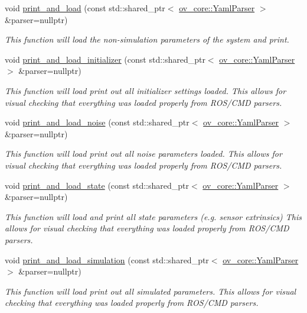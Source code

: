 \begin{DoxyCompactItemize}
\item 
void \hyperlink{structov__init_1_1InertialInitializerOptions_a4b4ecffffd22caa546e78b7765e6d0ea}{print\+\_\+and\+\_\+load} (const std\+::shared\+\_\+ptr$<$ \hyperlink{classov__core_1_1YamlParser}{ov\+\_\+core\+::\+Yaml\+Parser} $>$ \&parser=nullptr)
\begin{DoxyCompactList}\small\item\em This function will load the non-\/simulation parameters of the system and print. \end{DoxyCompactList}\item 
void \hyperlink{structov__init_1_1InertialInitializerOptions_a0f807d03fd000d632baaf934660a3a4c}{print\+\_\+and\+\_\+load\+\_\+initializer} (const std\+::shared\+\_\+ptr$<$ \hyperlink{classov__core_1_1YamlParser}{ov\+\_\+core\+::\+Yaml\+Parser} $>$ \&parser=nullptr)
\begin{DoxyCompactList}\small\item\em This function will load print out all initializer settings loaded. This allows for visual checking that everything was loaded properly from R\+O\+S/\+C\+MD parsers. \end{DoxyCompactList}\item 
void \hyperlink{structov__init_1_1InertialInitializerOptions_a4d5ee1a5eb1b3bb35d040e59df7d6541}{print\+\_\+and\+\_\+load\+\_\+noise} (const std\+::shared\+\_\+ptr$<$ \hyperlink{classov__core_1_1YamlParser}{ov\+\_\+core\+::\+Yaml\+Parser} $>$ \&parser=nullptr)
\begin{DoxyCompactList}\small\item\em This function will load print out all noise parameters loaded. This allows for visual checking that everything was loaded properly from R\+O\+S/\+C\+MD parsers. \end{DoxyCompactList}\item 
void \hyperlink{structov__init_1_1InertialInitializerOptions_a4bbf49110ccf3f02b36d90f2504a0196}{print\+\_\+and\+\_\+load\+\_\+state} (const std\+::shared\+\_\+ptr$<$ \hyperlink{classov__core_1_1YamlParser}{ov\+\_\+core\+::\+Yaml\+Parser} $>$ \&parser=nullptr)
\begin{DoxyCompactList}\small\item\em This function will load and print all state parameters (e.\+g. sensor extrinsics) This allows for visual checking that everything was loaded properly from R\+O\+S/\+C\+MD parsers. \end{DoxyCompactList}\item 
void \hyperlink{structov__init_1_1InertialInitializerOptions_a2dd58d205af3a419aa090f1f5291d0e2}{print\+\_\+and\+\_\+load\+\_\+simulation} (const std\+::shared\+\_\+ptr$<$ \hyperlink{classov__core_1_1YamlParser}{ov\+\_\+core\+::\+Yaml\+Parser} $>$ \&parser=nullptr)
\begin{DoxyCompactList}\small\item\em This function will load print out all simulated parameters. This allows for visual checking that everything was loaded properly from R\+O\+S/\+C\+MD parsers. \end{DoxyCompactList}\end{DoxyCompactItemize}
